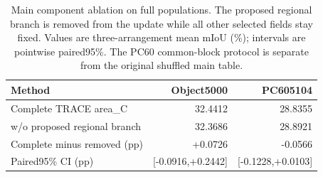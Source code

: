 \begin{table}[t]
\centering\small
\caption{Main component ablation on full populations. The proposed regional
branch is removed from the update while all other selected fields stay fixed.
Values are three-arrangement mean mIoU (\%); intervals are pointwise paired95\%.
The PC60 common-block protocol is separate from the original shuffled main table.}
\label{tab:main-component-removal}
\setlength{\tabcolsep}{5pt}
\begin{tabular}{lrr}
\toprule
Method & Object5000 & PC605104 \\
\midrule
Complete TRACE area\_C & 32.4412 & 28.8355 \\
w/o proposed regional branch & 32.3686 & 28.8921 \\
\midrule
Complete minus removed (pp) & +0.0726 & -0.0566 \\
Paired95\% CI (pp) & [-0.0916,+0.2442] & [-0.1228,+0.0103] \\
\bottomrule
\end{tabular}
\end{table}
